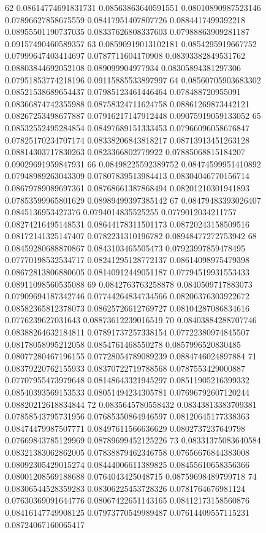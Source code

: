 62 0.08614774691831731 0.08563863640591551 0.08010890987523146 0.07896627858675559 0.08417951407807726 0.0884417499392218 0.08955501190737035 0.08337626808337603 0.07988863909281187 0.09157490460589357
63 0.08590919013102181 0.0854295919667752 0.07999647403414697 0.0787711604170908 0.08393382849531762 0.08803844692052108 0.089099904977934 0.08305894381297306 0.07951853774218196 0.09115885533897997
64 0.08560705903683302 0.08521538689654437 0.07985123461446464 0.078488720955091 0.08366874742355988 0.08758324711624758 0.08861269873442121 0.08267253498677887 0.07916217147912448 0.09075919059133052
65 0.08532552495284854 0.08497689151333453 0.07966096058676847 0.07825170234707174 0.08338206843818217 0.08713913451263128 0.08814303717830263 0.0823366802779922 0.07885068815184207 0.09029691959847931
66 0.08498225592389752 0.08474599951410892 0.07948989263043309 0.07807839513984413 0.08304046770156714 0.08679789089697361 0.08768661387868494 0.08201210301941893 0.07853599965801629 0.08989499397385142
67 0.08479483393026407 0.0845136953427376 0.0794014835525255 0.0779012034211757 0.08274216495148531 0.08644178311501173 0.08720243158509516 0.08172141325147407 0.0782231310196782 0.08948477272753942
68 0.08459280688870867 0.0843103465505473 0.07923997859478495 0.07770198532534717 0.08241295128772137 0.08614098975479398 0.08672813806880605 0.08140912449051187 0.07794519931553433 0.08911098560535088
69 0.0842763763258878 0.0840509717883073 0.07909694187342746 0.07744264834734566 0.08206376303922672 0.08582365812378073 0.08625726612769727 0.08104287086834616 0.0776239627031643 0.08873612239016519
70 0.08403884288707746 0.08388264632184811 0.07891737257338154 0.07722380974845507 0.08178058995212058 0.0854761468550278 0.0857996520830485 0.08077280467196155 0.07728054789089239 0.0884746024897884
71 0.08379220762155933 0.08370722719788568 0.0787553429000887 0.07707955473979648 0.08148643321945297 0.08511905216399332 0.08540393569153533 0.08051494234305781 0.07696792607120244 0.08820212618834844
72 0.0835645780558432 0.08343813383709381 0.07858543795731956 0.07685350864946597 0.08120645177338363 0.08474479987507771 0.08497611566636629 0.0802737237649798 0.07669843785129969 0.08789699452125226
73 0.08331375083640584 0.08321383062862005 0.07838879462346758 0.07656676844383008 0.08092305429015274 0.08444006611389825 0.08455610658356366 0.08001208569188688 0.0764043425048715 0.08759698489799718
74 0.08306544528359283 0.08306225453728326 0.0781764676981124 0.07630369091644776 0.08067422651143165 0.08412173158560876 0.08416147749908125 0.07973770549989487 0.07614409557115231 0.08724067160065417
